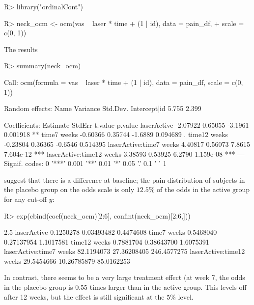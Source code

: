 \documentclass[article,nojss,shortnames]{jss}\usepackage[]{graphicx}\usepackage[]{xcolor}
\newcommand{\ry}{y}
\begin{document}
\begin{Schunk}
\begin{Sinput}
R> library("ordinalCont")
\end{Sinput}
\end{Schunk}
\begin{Schunk}
\begin{Sinput}
R> neck_ocm <- ocm(vas ~ laser * time + (1 | id), data = pain_df, 
+                  scale = c(0, 1))
\end{Sinput}
\end{Schunk}
The results
\begin{Schunk}
\begin{Sinput}
R> summary(neck_ocm)
\end{Sinput}
\begin{Soutput}
Call:
ocm(formula = vas ~ laser * time + (1 | id), data = pain_df, 
    scale = c(0, 1))

Random effects:
         Name Variance Std.Dev.
 Intercept|id    5.755    2.399

Coefficients:
                         Estimate   StdErr t.value   p.value    
laserActive              -2.07922  0.65055 -3.1961  0.001918 ** 
time7 weeks              -0.60366  0.35744 -1.6889  0.094689 .  
time12 weeks             -0.23804  0.36365 -0.6546  0.514395    
laserActive:time7 weeks   4.40817  0.56073  7.8615 7.604e-12 ***
laserActive:time12 weeks  3.38593  0.53925  6.2790 1.159e-08 ***
---
Signif. codes:  0 '***' 0.001 '**' 0.01 '*' 0.05 '.' 0.1 ' ' 1
\end{Soutput}
\end{Schunk}
suggest that there is a difference at baseline; the pain distribution of 
subjects in the placebo group on the odds scale is only 
$12.5\%$ of the odds in the active 
group for any cut-off $\ry$:
\begin{Schunk}
\begin{Sinput}
R> exp(cbind(coef(neck_ocm)[2:6], confint(neck_ocm)[2:6,]))
\end{Sinput}
\begin{Soutput}
                                          2.5 %      97.5 %
laserActive               0.1250278  0.03493482   0.4474608
time7 weeks               0.5468040  0.27137954   1.1017581
time12 weeks              0.7881704  0.38643700   1.6075391
laserActive:time7 weeks  82.1194073 27.36208405 246.4577275
laserActive:time12 weeks 29.5454666 10.26785879  85.0162253
\end{Soutput}
\end{Schunk}
In contrast, there seems to be a very large treatment effect (at week 7, the
odds in the placebo group is $0.55$ times
larger than in the active group. This levels off after 12 weeks, but the
effect is still significant at the $5\%$ level.
\end{document}

